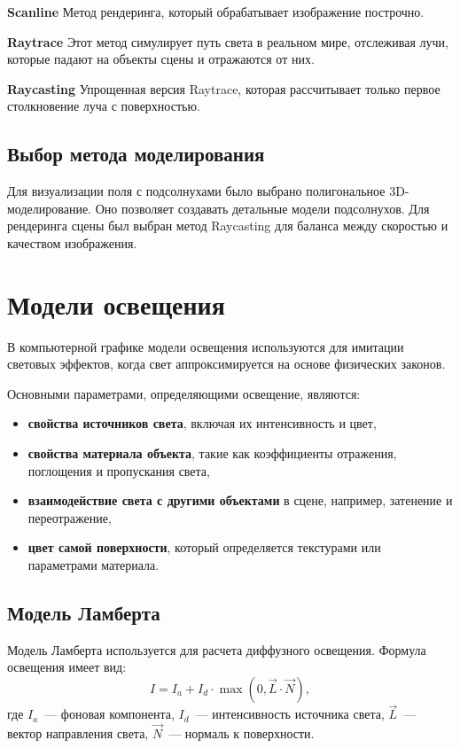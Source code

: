 \textbf{Scanline}
Метод рендеринга, который обрабатывает изображение построчно.

\textbf{Raytrace}
Этот метод симулирует путь света в реальном мире, отслеживая лучи, которые падают на объекты сцены и отражаются от них.

\textbf{Raycasting}
Упрощенная версия Raytrace, которая рассчитывает только первое столкновение луча с поверхностью.

\subsection{Выбор метода моделирования}
Для визуализации поля с подсолнухами было выбрано полигональное 3D-моделирование. Оно позволяет создавать детальные модели подсолнухов. Для рендеринга сцены был выбран метод Raycasting для баланса между скоростью и качеством изображения.



\section{Модели освещения}

В компьютерной графике модели освещения используются для имитации световых эффектов, когда свет аппроксимируется на основе физических законов. 

Основными параметрами, определяющими освещение, являются:
\begin{itemize}
    \item \textbf{свойства источников света}, включая их интенсивность и цвет,
    \item \textbf{свойства материала объекта}, такие как коэффициенты отражения, поглощения и пропускания света,
    \item \textbf{взаимодействие света с другими объектами} в сцене, например, затенение и переотражение,
    \item \textbf{цвет самой поверхности}, который определяется текстурами или параметрами материала.
\end{itemize}



\subsection{Модель Ламберта}

Модель Ламберта используется для расчета диффузного освещения. Формула освещения имеет вид:
\[
I = I_a + I_d \cdot \max(0, \vec{L} \cdot \vec{N}),
\]
где 
\( I_a \)~--- фоновая компонента, 
\( I_d \)~--- интенсивность источника света, 
\( \vec{L} \)~--- вектор направления света, 
\( \vec{N} \)~--- нормаль к поверхности.

